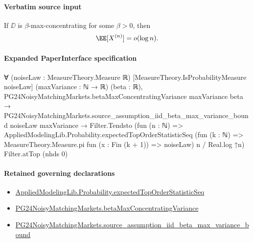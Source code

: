 \documentclass[10pt]{article}
\begin{document}
\paragraph{Verbatim source input}
\begin{ReviewVerbatim}
\begin{lemma}\label{lem:log-bound}
    If $\DD$ is $\beta$-max-concentrating for some $\beta>0$, then
    \begin{equation}
        \EE[X^{(n)}] = o(\log n).
    \end{equation}
\end{lemma}
\end{ReviewVerbatim}



\paragraph{Expanded PaperInterface specification}
\begin{ReviewVerbatim}
∀ (noiseLaw : MeasureTheory.Measure ℝ) [MeasureTheory.IsProbabilityMeasure noiseLaw] (maxVariance : ℕ → ℝ) (beta : ℝ),
  PG24NoisyMatchingMarkets.betaMaxConcentratingVariance maxVariance beta →
    PG24NoisyMatchingMarkets.source_assumption_iid_beta_max_variance_bound noiseLaw maxVariance →
      Filter.Tendsto
        (fun (n : ℕ) =>
          AppliedModelingLib.Probability.expectedTopOrderStatisticSeq
              (fun (k : ℕ) => MeasureTheory.Measure.pi fun (x : Fin (k + 1)) => noiseLaw) n /
            Real.log ↑n)
        Filter.atTop (nhds 0)
\end{ReviewVerbatim}

\paragraph{Retained governing declarations}
\begin{itemize}\raggedright
\item \hyperlink{governing-declaration-0b73f814382be426}{Applied\allowbreak{}Modeling\allowbreak{}Lib.\allowbreak{}Probability.\allowbreak{}expected\allowbreak{}Top\allowbreak{}Order\allowbreak{}Statistic\allowbreak{}Seq}
\item \hyperlink{governing-declaration-322e8322d17fd70c}{PG24\allowbreak{}Noisy\allowbreak{}Matching\allowbreak{}Markets.\allowbreak{}beta\allowbreak{}Max\allowbreak{}Concentrating\allowbreak{}Variance}
\item \hyperlink{governing-declaration-106a735d10bd3342}{PG24\allowbreak{}Noisy\allowbreak{}Matching\allowbreak{}Markets.\allowbreak{}source\_\allowbreak{}assumption\_\allowbreak{}iid\_\allowbreak{}beta\_\allowbreak{}max\_\allowbreak{}variance\_\allowbreak{}bound}
\end{itemize}
\end{document}
